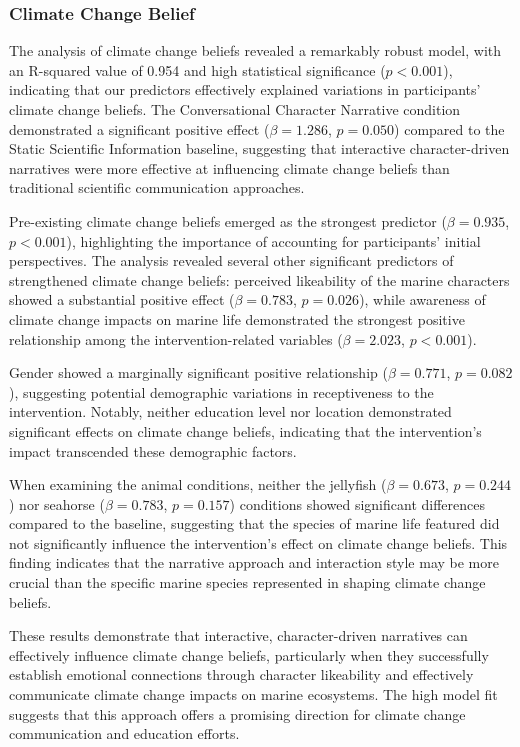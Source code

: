 \documentclass[sigconf, nonacm]{acmart}
\begin{document}
\subsubsection{Climate Change Belief}
The analysis of climate change beliefs revealed a remarkably robust model, with an R-squared value of 0.954 and high statistical significance ($p < 0.001$), indicating that our predictors effectively explained variations in participants' climate change beliefs. The Conversational Character Narrative condition demonstrated a significant positive effect ($\beta = 1.286$, $p = 0.050$) compared to the Static Scientific Information baseline, suggesting that interactive character-driven narratives were more effective at influencing climate change beliefs than traditional scientific communication approaches.

Pre-existing climate change beliefs emerged as the strongest predictor ($\beta = 0.935$, $p < 0.001$), highlighting the importance of accounting for participants' initial perspectives. The analysis revealed several other significant predictors of strengthened climate change beliefs: perceived likeability of the marine characters showed a substantial positive effect ($\beta = 0.783$, $p = 0.026$), while awareness of climate change impacts on marine life demonstrated the strongest positive relationship among the intervention-related variables ($\beta = 2.023$, $p < 0.001$).

Gender showed a marginally significant positive relationship ($\beta = 0.771$, $p = 0.082$), suggesting potential demographic variations in receptiveness to the intervention. Notably, neither education level nor location demonstrated significant effects on climate change beliefs, indicating that the intervention's impact transcended these demographic factors.

When examining the animal conditions, neither the jellyfish ($\beta = 0.673$, $p = 0.244$) nor seahorse ($\beta = 0.783$, $p = 0.157$) conditions showed significant differences compared to the baseline, suggesting that the species of marine life featured did not significantly influence the intervention's effect on climate change beliefs. This finding indicates that the narrative approach and interaction style may be more crucial than the specific marine species represented in shaping climate change beliefs.

These results demonstrate that interactive, character-driven narratives can effectively influence climate change beliefs, particularly when they successfully establish emotional connections through character likeability and effectively communicate climate change impacts on marine ecosystems. The high model fit suggests that this approach offers a promising direction for climate change communication and education efforts.
\end{document}
